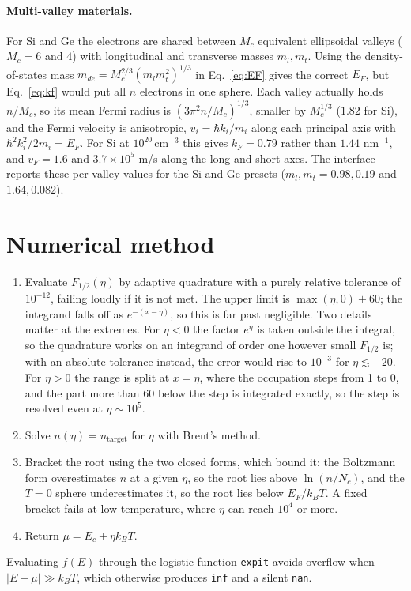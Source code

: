 \documentclass[aps,prb,reprint,nofootinbib]{revtex4-2}
\begin{document}
\paragraph{Multi-valley materials.} For Si and Ge the electrons are shared between $M_c$
equivalent ellipsoidal valleys ($M_c=6$ and $4$) with longitudinal and transverse masses
$m_l,m_t$. Using the density-of-states mass $m_{de}=M_c^{2/3}(m_lm_t^2)^{1/3}$ in
Eq.~\eqref{eq:EF} gives the correct $E_F$, but Eq.~\eqref{eq:kf} would put all $n$ electrons in
one sphere. Each valley actually holds $n/M_c$, so its mean Fermi radius is
$(3\pi^2n/M_c)^{1/3}$, smaller by $M_c^{1/3}$ ($1.82$ for Si), and the Fermi velocity is
anisotropic, $v_i=\hbar k_i/m_i$ along each principal axis with $\hbar^2k_i^2/2m_i=E_F$. For Si at
$10^{20}\,$cm$^{-3}$ this gives $k_F=0.79$ rather than $1.44$ nm$^{-1}$, and
$v_F=1.6$ and $3.7\times10^5$ m/s along the long and short axes. The interface reports these
per-valley values for the Si and Ge presets ($m_l,m_t=0.98,0.19$ and $1.64,0.082$).

\section{Numerical method}

\begin{enumerate}
  \item Evaluate $F_{1/2}(\eta)$ by adaptive quadrature with a purely relative tolerance of
        $10^{-12}$, failing loudly if it is not met. The upper limit is $\max(\eta,0)+60$; the
        integrand falls off as $e^{-(x-\eta)}$, so this is far past negligible. Two details
        matter at the extremes. For $\eta<0$ the factor $e^\eta$ is taken outside the integral,
        so the quadrature works on an integrand of order one however small $F_{1/2}$ is; with
        an absolute tolerance instead, the error would rise to $10^{-3}$ for $\eta\lesssim-20$.
        For $\eta>0$ the range is split at $x=\eta$, where the occupation steps from 1 to 0,
        and the part more than $60$ below the step is integrated exactly, so the step is
        resolved even at $\eta\sim10^{5}$.
  \item Solve $n(\eta)=n_{\text{target}}$ for $\eta$ with Brent's method.
  \item Bracket the root using the two closed forms, which bound it: the Boltzmann form
        overestimates $n$ at a given $\eta$, so the root lies above $\ln(n/N_c)$, and the
        $T=0$ sphere underestimates it, so the root lies below $E_F/k_BT$. A fixed bracket
        fails at low temperature, where $\eta$ can reach $10^{4}$ or more.
  \item Return $\mu = E_c + \eta k_BT$.
\end{enumerate}
Evaluating $f(E)$ through the logistic function \texttt{expit} avoids overflow when
$|E-\mu|\gg k_BT$, which otherwise produces \texttt{inf} and a silent \texttt{nan}.
\end{document}
